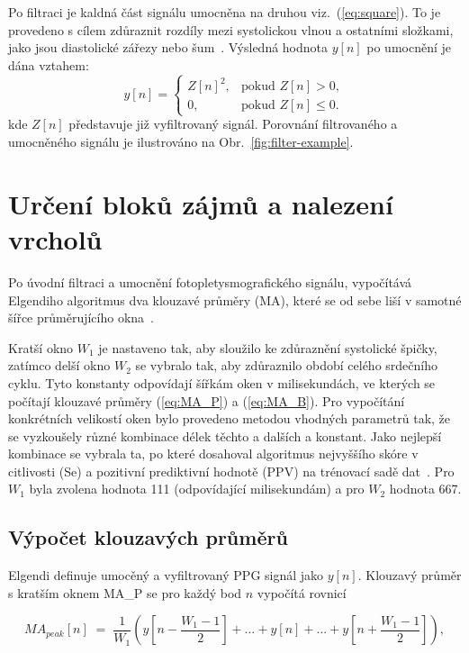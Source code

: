 Po filtraci je kaldná část signálu umocněna na druhou viz.~(\ref{eq:square}).
To je provedeno s cílem zdůraznit rozdíly mezi systolickou vlnou a ostatními složkami, jako jsou diastolické zářezy nebo šum~\cite{Elgendi2013}.
Výsledná hodnota $y[n]$ po umocnění je dána vztahem:
\begin{equation}
	\label{eq:square}
		y[n] =
		\begin{cases}
			Z[n]^2, & \text{pokud } Z[n] > 0,\\[1mm]
			0, & \text{pokud } Z[n] \le 0.
		\end{cases}
	\end{equation}
kde $Z[n]$ představuje již vyfiltrovaný signál.
Porovnání filtrovaného a umocněného signálu je ilustrováno na Obr.~\ref{fig:filter-example}.

\section{Určení bloků zájmů a nalezení vrcholů}
\label{sec:thr_peaks}
% 
Po úvodní filtraci a umocnění fotopletysmografického signálu, vypočítává Elgendiho algoritmus dva klouzavé průměry (\acs{MA}), které se od sebe liší v samotné šířce průměrujícího okna~\cite{Elgendi2013}.

Kratší okno \(W_1\) je nastaveno tak, aby sloužilo ke zdůraznění systolické špičky, zatímco delší okno \(W_2\) se vybralo tak, aby zdůraznilo období celého srdečního cyklu.
Tyto konstanty odpovídají šířkám oken v milisekundách, ve kterých se počítají klouzavé průměry (\ref{eq:MA_P}) a (\ref{eq:MA_B}).
Pro vypočítání konkrétních velikostí oken bylo provedeno metodou  vhodných parametrů tak, že se vyzkoušely různé kombinace délek těchto a dalších a konstant.
Jako nejlepší kombinace se vybrala ta, po které dosahoval algoritmus nejvyššího skóre v citlivosti (\acs{Se}) a pozitivní prediktivní hodnotě (\acs{PPV}) na trénovací sadě dat~\cite{Elgendi2013}.
Pro \(W_1\) byla zvolena hodnota 111 (odpovídající milisekundám) a pro \(W_2\) hodnota 667.

\subsection*{Výpočet klouzavých průměrů} %
\label{sec:MA}
% 
Elgendi definuje umocěný a vyfiltrovaný \acs{PPG} signál jako \(y[n]\).
Klouzavý průměr s kratším oknem \acs{MA_P} se pro každý bod \(n\) vypočítá rovnicí

\begin{equation}
	MA_{peak}[n] \;=\;
	\frac{1}{W_1}
	(y[n - \frac{W_1-1}{2}] + \ldots + y[n] + \ldots + y[n + \frac{W_1-1}{2}]),
	\label{eq:MA_P}
\end{equation}

